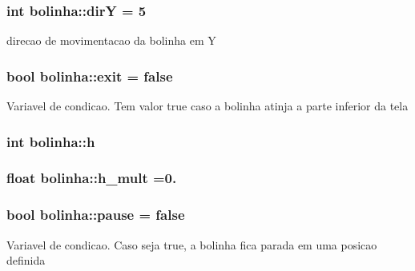 \subsubsection[{\texorpdfstring{dirY}{dirY}}]{\setlength{\rightskip}{0pt plus 5cm}int bolinha\+::dirY = 5\hspace{0.3cm}{\ttfamily [private]}}\hypertarget{classbolinha_a9ed43eedc9ce54d9645824b4a876171e}{}\label{classbolinha_a9ed43eedc9ce54d9645824b4a876171e}
direcao de movimentacao da bolinha em Y 
\subsubsection[{\texorpdfstring{exit}{exit}}]{\setlength{\rightskip}{0pt plus 5cm}bool bolinha\+::exit = false\hspace{0.3cm}{\ttfamily [private]}}\hypertarget{classbolinha_a29132ebeca6235fa17c303151622cd3b}{}\label{classbolinha_a29132ebeca6235fa17c303151622cd3b}
Variavel de condicao. Tem valor true caso a bolinha atinja a parte inferior da tela 
\subsubsection[{\texorpdfstring{h}{h}}]{\setlength{\rightskip}{0pt plus 5cm}int bolinha\+::h\hspace{0.3cm}{\ttfamily [private]}}\hypertarget{classbolinha_a971dc9047d1dcc5fd7cf4c4ed945de45}{}\label{classbolinha_a971dc9047d1dcc5fd7cf4c4ed945de45}
\subsubsection[{\texorpdfstring{h\+\_\+mult}{h_mult}}]{\setlength{\rightskip}{0pt plus 5cm}float bolinha\+::h\+\_\+mult =0.\hspace{0.3cm}{\ttfamily [private]}}\hypertarget{classbolinha_add6888f6be8396c001dfa10e15d6a4be}{}\label{classbolinha_add6888f6be8396c001dfa10e15d6a4be}
\subsubsection[{\texorpdfstring{pause}{pause}}]{\setlength{\rightskip}{0pt plus 5cm}bool bolinha\+::pause = false\hspace{0.3cm}{\ttfamily [private]}}\hypertarget{classbolinha_a85326b85a811e46b6d98c900e141b0ef}{}\label{classbolinha_a85326b85a811e46b6d98c900e141b0ef}
Variavel de condicao. Caso seja true, a bolinha fica parada em uma posicao definida 
